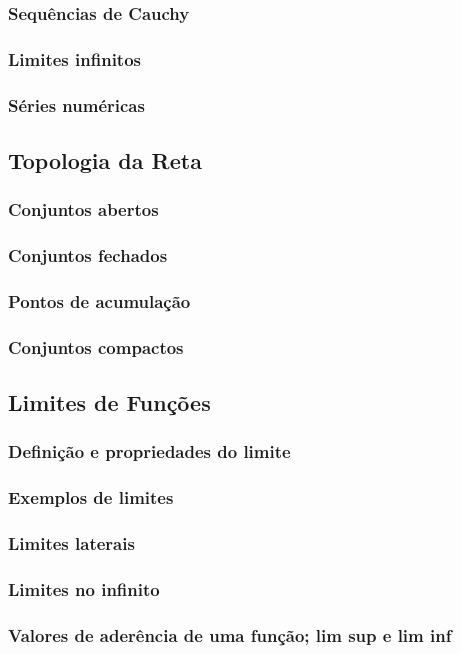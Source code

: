 \documentclass{article}
\theoremstyle{theorem}
\theoremstyle{lemma}
\theoremstyle{definition}
\theoremstyle{remark}
\begin{document}
   \subsubsection{ Sequências de Cauchy}
   \subsubsection{ Limites infinitos}
   \subsubsection{ Séries numéricas}
\subsection{ Topologia da Reta}
   \subsubsection{ Conjuntos abertos}
   \subsubsection{ Conjuntos fechados}
   \subsubsection{ Pontos de acumulação}
   \subsubsection{ Conjuntos compactos}
\subsection{ Limites de Funções}
   \subsubsection{ Definição e propriedades do limite}
   \subsubsection{ Exemplos de limites}
   \subsubsection{ Limites laterais}
   \subsubsection{ Limites no infinito}
   \subsubsection{ Valores de aderência de uma função; lim sup e lim inf}
\end{document}
